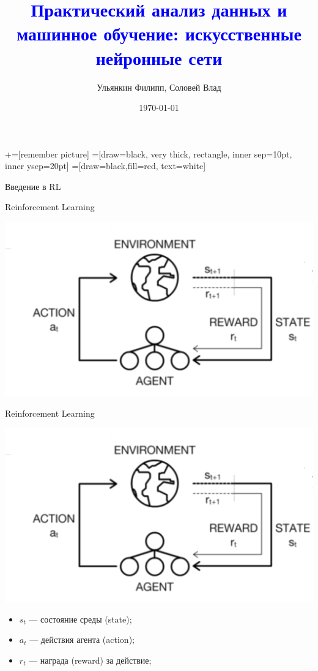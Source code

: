 \documentclass[notes,12pt, aspectratio=169]{beamer}
\title[]{\textcolor{blue}{Практический анализ данных и машинное обучение: искусственные нейронные сети}}
\author{Ульянкин Филипп, Соловей Влад}
\date{\today}
\begin{document}
\newcommand\marktopleft[1]{%
    \tikz[overlay,remember picture] 
        \node (marker-#1-a) at (-.3em,.3em) {};%
}
\newcommand\markbottomright[2]{%
    \tikz[overlay,remember picture] 
        \node (marker-#1-b) at (0em,0em) {};%
}
+=[remember picture] 
 =[draw=black, very thick, rectangle, inner sep=10pt, inner ysep=20pt]
 =[draw=black,fill=red, text=white]

\begin{frame}
\maketitle
\centering Введение в RL 
\end{frame}


\begin{frame}{Reinforcement Learning}
\begin{center}
	\includegraphics[width=.6\linewidth]{rl_1.png}
\end{center}
\end{frame}


\begin{frame}{Reinforcement Learning}
\begin{center}
	\includegraphics[width=.4\linewidth]{rl_1.png}
\end{center}
\begin{itemize}
	\item  $s_t$ --- состояние среды (state);
	\item  $a_t$ --- действия агента (action);
	\item  $r_t$ --- награда (reward) за действие;
\end{itemize}
\end{frame}
\end{document}
